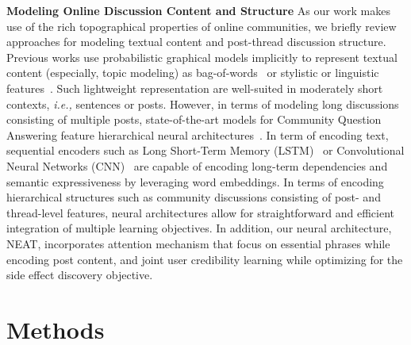 \documentclass{bmcart}
\begin{document}
{\bf Modeling Online Discussion Content and Structure}
As our work makes use of the rich topographical properties of online communities, 
we briefly review approaches for modeling textual content and post-thread discussion structure. 
Previous works use probabilistic graphical models implicitly to represent textual content (especially, topic modeling) as bag-of-words~\cite{yates2015extracting,wang2014sideeffectptm} or stylistic or linguistic features~\cite{mukherjee2014people}.
Such lightweight representation are well-suited in moderately short contexts, \textit{i.e.,} sentences or posts. However, in terms of modeling long discussions consisting of multiple posts, state-of-the-art models for
Community Question Answering feature hierarchical neural architectures~\cite{qiu2015convolutional,zhou2018recurrent,zhang2017attentive}. In term of encoding text, sequential encoders such as 
Long Short-Term Memory (LSTM)~\cite{hochreiter1997long} or Convolutional Neural Networks (CNN)~\cite{kim2014convolutional} are capable of encoding long-term dependencies and semantic expressiveness by leveraging word embeddings. In terms of encoding hierarchical structures such as community discussions consisting of post- and thread-level features, neural architectures allow for straightforward and efficient integration of multiple learning objectives. In addition, our neural architecture, NEAT, incorporates attention mechanism that focus on essential phrases while encoding post content, and joint user credibility learning while optimizing for the side effect discovery objective.

\section{Methods}\label{sec:proposed_method}
\end{document}
